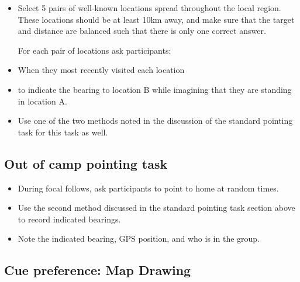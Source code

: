 \documentclass{article}
\begin{document}
\begin{itemize}

\item Select 5 pairs of well-known locations spread throughout the local region.  These locations should be at least 10km away, and make sure that the target and distance are balanced such that there is only one correct answer.

For each pair of locations ask participants:

\item When they most recently visited each location

\item to indicate the bearing to location B while imagining that they are standing in location A.

\item Use one of the two methods noted in the discussion of the standard pointing task for this task as well.

\end{itemize}


\subsection{Out of camp pointing task}

\begin{itemize}

\item During focal follows, ask participants to point to home at random times.

\item Use the second method discussed in the standard pointing task section above to record indicated bearings.

\item Note the indicated bearing, GPS position, and who is in the group.

\end{itemize}


\subsection{Cue preference: Map Drawing}
\end{document}
